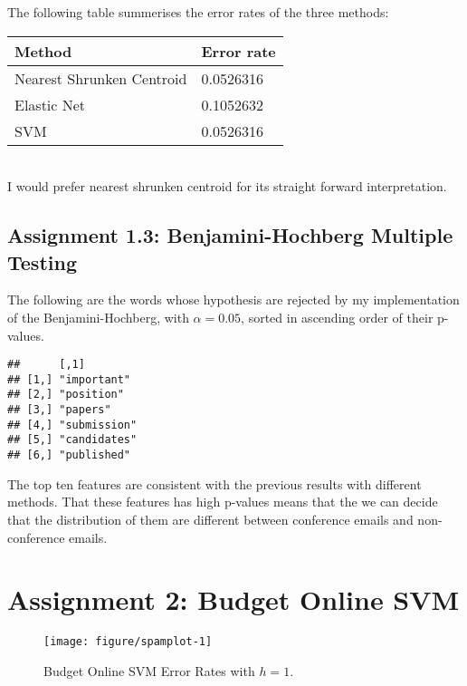 \documentclass[11pt,english]{article}\usepackage[]{graphicx}\usepackage[]{color}
\makeatletter
\def\maxwidth{ %
  \ifdim\Gin@nat@width>\linewidth
    \linewidth
  \else
    \Gin@nat@width
  \fi
}
\newenvironment{kframe}{%
 \def\at@end@of@kframe{}%
 \ifinner\ifhmode%
  \def\at@end@of@kframe{\end{minipage}}%
  \begin{minipage}{\columnwidth}%
 \fi\fi%
 \def\FrameCommand##1{\hskip\@totalleftmargin \hskip-\fboxsep
 \colorbox{shadecolor}{##1}\hskip-\fboxsep
     \hskip-\linewidth \hskip-\@totalleftmargin \hskip\columnwidth}%
 \MakeFramed {\advance\hsize-\width
   \@totalleftmargin\z@ \linewidth\hsize
   \@setminipage}}%
 {\par\unskip\endMakeFramed%
 \at@end@of@kframe}
\newenvironment{knitrout}{}{} %
\makeatother
\begin{document}
The following table summerises the error rates of the three methods:\\
\begin{tabular}{l|l}
Method & Error rate\\
\hline
Nearest Shrunken Centroid & 0.0526316\\
Elastic Net & 0.1052632\\
SVM & 0.0526316
\end{tabular}\\

I would prefer nearest shrunken centroid for its straight forward
interpretation.


\subsection*{Assignment 1.3: Benjamini-Hochberg Multiple Testing}



The following are the words whose hypothesis are rejected by my
implementation of the Benjamini-Hochberg, with $\alpha = 0.05$,
sorted in ascending order of their p-values.

\begin{knitrout}\small
{}\color{fgcolor}\begin{kframe}
\begin{verbatim}
##      [,1]        
## [1,] "important" 
## [2,] "position"  
## [3,] "papers"    
## [4,] "submission"
## [5,] "candidates"
## [6,] "published"
\end{verbatim}
\end{kframe}
\end{knitrout}

The top ten features are consistent with the previous results with different
methods. That these features has high p-values means that the we can decide
that the distribution of them are different between conference emails and
non-conference emails.


\section*{Assignment 2: Budget Online SVM}



\begin{figure}[H]
  \centering
\begin{knitrout}\small
{}\color{fgcolor}
\texttt{[image: figure/spamplot-1]} 

\end{knitrout}
\caption{Budget Online SVM Error Rates with $h = 1$.}
\label{spamplot}
\end{figure}
\end{document}
